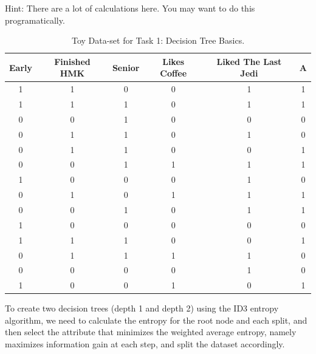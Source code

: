 \documentclass[12pt,letterpaper, onecolumn]{exam}
\begin{document}
\begin{questions}
\begin{parts}
      Hint: There are a lot of calculations here. You may want to do this programatically.

        \begin{table}[!h]
            \begin{center}
            \begin{tabular}{c | c | c | c| c || c}
                \hline
                Early & Finished HMK & Senior & Likes Coffee & Liked The Last Jedi & A \\
                \hline
                \hline
                1 & 1 & 0 & 0 & 1 & 1 \\
                \hline
                1 & 1 & 1 & 0 & 1 & 1 \\
                \hline
                0 & 0 & 1 & 0 & 0 & 0 \\
                \hline
                0 & 1 & 1 & 0 & 1 & 0 \\ 
                \hline
                0 & 1 & 1 & 0 & 0 & 1 \\
                \hline
                0 & 0 & 1 & 1 & 1 & 1 \\ 
                \hline
                1 & 0 & 0 & 0 & 1 & 0 \\
                \hline
                0 & 1 & 0 & 1 & 1 & 1 \\ 
                \hline
                0 & 0 & 1 & 0 & 1 & 1 \\
                \hline
                1 & 0 & 0 & 0 & 0 & 0 \\ 
                \hline
                1 & 1 & 1 & 0 & 0 & 1 \\
                \hline
                0 & 1 & 1 & 1 & 1 & 0 \\ 
                \hline
                0 & 0 & 0 & 0 & 1 & 0 \\
                \hline
                1 & 0 & 0 & 1 & 0 & 1 \\ 
                \hline
            \end{tabular}
            \end{center}
            \caption{Toy Data-set for Task 1: Decision Tree Basics.}
        \end{table}
      
      \begin{solution}

        To create two decision trees (depth 1 and depth 2) using the ID3 entropy
        algorithm, we need to calculate the entropy for the root node and each split, 
        and then select the attribute that minimizes the weighted average entropy, 
        namely maximizes information gain at each step, and split the dataset accordingly.


\end{solution}
\end{parts}
\end{questions}
\end{document}
